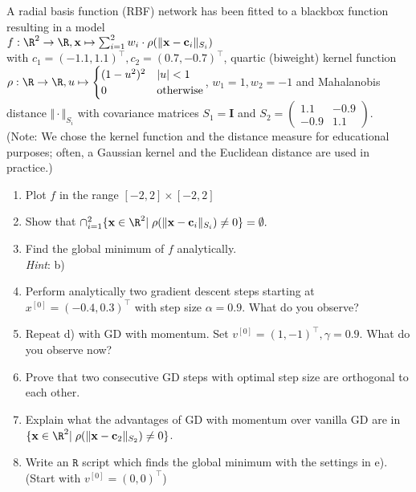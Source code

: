 A radial basis function (RBF) network has been fitted to a blackbox function resulting in a model \\
$f:\R^2\rightarrow\R, \mathbf{x} \mapsto \sum^2_{i=1} w_i \cdot \rho(\Vert\mathbf{x} - \mathbf{c}_i\Vert_{S_i})$ \\
with $c_1 = (-1.1, 1.1)^\top, c_2 = (0.7, -0.7)^\top$, quartic (biweight) kernel function $\rho:\R\rightarrow\R, u \mapsto \begin{cases} (1-u^2)^2 & \vert u\vert < 1 \\ 0 & \text{otherwise} \end{cases}$, $w_1 = 1, w_2 = -1$ and Mahalanobis distance $\Vert \cdot \Vert_{S_i}$ with covariance matrices $S_1 = \mathbf{I}$ and $S_2 = \begin{pmatrix} 1.1 & -0.9 \\ -0.9 & 1.1\end{pmatrix}$.\\
(Note: We chose the kernel function and the distance measure for educational purposes; often, a Gaussian kernel and the Euclidean distance are used in practice.)

\begin{enumerate}
\item Plot $f$ in the range $[-2, 2] \times [-2, 2]$
\item Show that $\cap^2_{i=1} \{\mathbf{x} \in \R^2|\; \rho(\Vert\mathbf{x} - \mathbf{c}_i\Vert_{S_i}) \neq 0\} = \emptyset.$ 
\item Find the global minimum of $f$ analytically. \\
\textit{Hint}: b)
\item Perform analytically two gradient descent steps starting at $x^{[0]} = (-0.4, 0.3)^\top$ with step size $\alpha=0.9$.
What do you observe? 
\item Repeat d) with GD with momentum. Set $v^{[0]} = (1, -1)^\top, \gamma = 0.9.$ What do you observe now?
\item Prove that two consecutive GD steps with optimal step size are orthogonal to each other.
\item Explain what the advantages of GD with momentum over vanilla GD are in $\{\mathbf{x} \in \R^2|\; \rho(\Vert\mathbf{x} - \mathbf{c}_2\Vert_{S_2}) \neq 0\}$.
\item Write an $\texttt{R}$ script which finds the global minimum with the settings in e). (Start with $v^{[0]} = (0,0)^\top$)
\end{enumerate}
